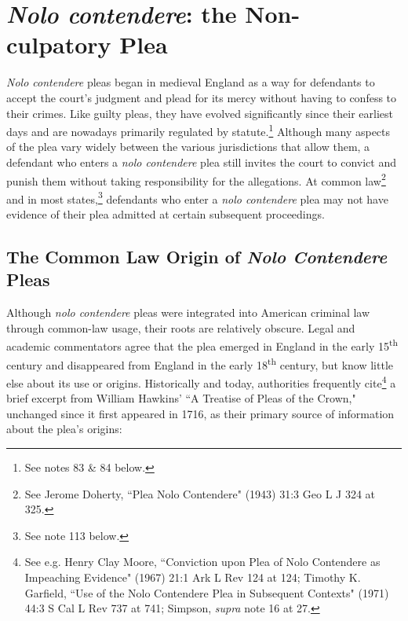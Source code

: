 \section{\textit{Nolo contendere}: the Non-culpatory Plea}

\textit{Nolo contendere} pleas began in medieval England as a way for defendants to accept the court's judgment and plead for its mercy without having to confess to their crimes. Like guilty pleas, they have evolved significantly since their earliest days and are nowadays primarily regulated by statute.\footnote{See notes 83 \& 84 below.} Although many aspects of the plea vary widely between the various jurisdictions that allow them, a defendant who enters a \textit{nolo contendere} plea still invites the court to convict and punish them without taking responsibility for the allegations. At common law\footnote{See Jerome Doherty, ``Plea Nolo Contendere" (1943) 31:3 Geo L J 324 at 325.} and in most states,\footnote{See note 113 below.} defendants who enter a \textit{nolo contendere} plea may not have evidence of their plea admitted at certain subsequent proceedings. 

\subsection{The Common Law Origin of \textit{Nolo Contendere} Pleas}

Although \textit{nolo contendere} pleas were integrated into American criminal law through common-law usage, their roots are relatively obscure. Legal and academic commentators agree that the plea emerged in England in the early 15\textsuperscript{th} century and disappeared from England in the early 18\textsuperscript{th} century, but know little else about its use or origins. Historically and today, authorities frequently cite\footnote{See e.g. Henry Clay Moore, ``Conviction upon Plea of Nolo Contendere as Impeaching Evidence" (1967) 21:1 Ark L Rev 124 at 124; Timothy K. Garfield, ``Use of the Nolo Contendere Plea in Subsequent Contexts" (1971) 44:3 S Cal L Rev 737 at 741; Simpson, \textit{supra} note 16 at 27.} a brief excerpt from William Hawkins' ``A Treatise of Pleas of the Crown," unchanged since it first appeared in 1716, as their primary source of information about the plea's origins:

